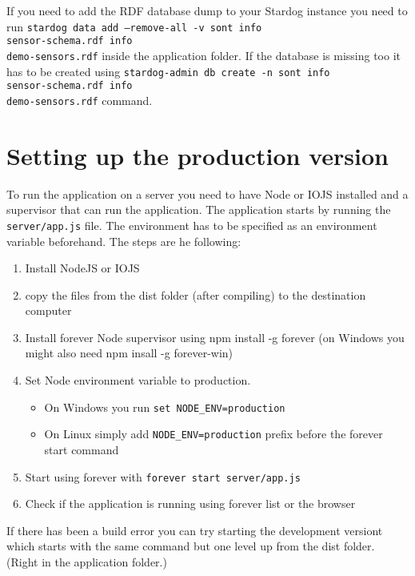 If you need to add the RDF database dump to your Stardog instance you need to run \texttt{stardog data add --remove-all -v sont info\\sensor-schema.rdf info\\demo-sensors.rdf} inside the application folder. If the database is missing too it has to be created using \texttt{stardog-admin db create -n sont info\\sensor-schema.rdf info\\demo-sensors.rdf} command.

\section{Setting up the production version}

To run the application on a server you need to have Node or IOJS installed and a supervisor that can run the application. The application starts by running the \texttt{server/app.js} file. The environment has to be specified as an environment variable beforehand. The steps are he following:
\begin{enumerate}
\item Install NodeJS or IOJS
\item copy the files from the dist folder (after compiling) to the destination computer
\item Install forever Node supervisor using npm install -g forever (on Windows you might also need npm insall -g forever-win)
\item Set Node environment variable to production.
\begin{itemize}
\item On Windows you run \texttt{set NODE\_ENV=production}
\item On Linux simply add \texttt{NODE\_ENV=production} prefix before the forever start command
\end{itemize}
\item Start using forever with \texttt{forever start server/app.js}
\item Check if the application is running using forever list or the browser
\end{enumerate}
If there has been a build error you can try starting the development versiont which starts with the same command but one level up from the dist folder. (Right in the application folder.)